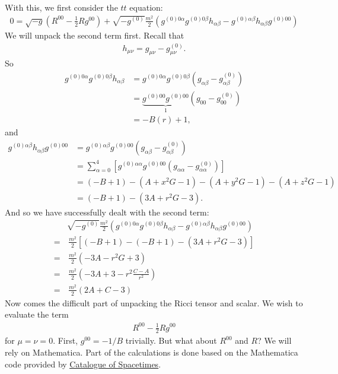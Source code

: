\documentclass{book}
\theoremstyle{definition}
\newcommand{\nn}{\nonumber}
\newcommand{\al}{\alpha}
\newcommand{\be}{\beta}
\newcommand{\f}[2]{\frac{#1}{#2}}
\newcommand{\lp}{\left(}
\newcommand{\rp}{\right)}
\newcommand{\lb}{\left[}
\newcommand{\rb}{\right]}
\begin{document}
With this, we first consider the $tt$ equation:
\begin{align}
{0 = \sqrt{-g}\lp R^{00} - \f{1}{2}Rg^{00} \rp + \sqrt{-g^{(0)}}\f{m^2}{2}\lp g^{(0)0\alpha}g^{(0)0\beta}h_{\alpha\beta} - g^{(0)\alpha\beta}h_{\alpha\beta}g^{(0)00}\rp}
\end{align}
We will unpack the second term first. Recall that
\begin{align}
h_{\mu\nu} = g_{\mu\nu} - g_{\mu\nu}^{(0)}.
\end{align}
So
\begin{align}
g^{(0)0\alpha}g^{(0)0\beta}h_{\alpha\beta} &= g^{(0)0\alpha}g^{(0)0\beta}\lp g_{\al\be} - g_{\al\be}^{(0)} \rp\nn\\
&= \underbrace{g^{(0)00}g^{(0)00}}_{1}\lp g_{00} - g_{00}^{(0)} \rp\nn\\
&= -B(r) + 1,
\end{align}
and
\begin{align}
g^{(0)\alpha\beta}h_{\alpha\beta}g^{(0)00} &= g^{(0)\alpha\beta}g^{(0)00}\lp g_{\al\be} - g_{\al\be}^{(0)}  \rp\nn\\
&= \sum^4_{\alpha=0}\lb g^{(0)\alpha\al}g^{(0)00}\lp g_{\al\al} - g_{\al\al}^{(0)}  \rp  \rb\nn\\
&= \lp-B+1\rp  - \lp A + x^2G -1  \rp -  \lp A + y^2G - 1 \rp - \lp A + z^2G - 1 \rp\nn\\
&= (-B+1) - (3A + r^2G -3).
\end{align}
And so we have successfully dealt with the second term:
\begin{align}
&\sqrt{-g^{(0)}}\f{m^2}{2}\lp g^{(0)0\alpha}g^{(0)0\beta}h_{\alpha\beta} - g^{(0)\alpha\beta}h_{\alpha\beta}g^{(0)00}\rp\nn\\
= &\,\f{m^2}{2}\lb (-B + 1) - (-B+1) - (3A + r^2G-3) \rb\nn\\
= &\,\f{m^2}{2}(-3A - r^2G + 3) \nn\\
= &\,\f{m^2}{2}\lp -3A + 3 - r^2 \f{C-A}{r^2}\rp\nn\\
= &\,\boxed{\f{m^2}{2}\lp  2A + C - 3\rp}
\end{align}
Now comes the difficult part of unpacking the Ricci tensor and scalar. We wish to evaluate the term
\begin{align}
R^{00} - \f{1}{2}Rg^{00}
\end{align}
for $\mu = \nu = 0$. First, $g^{00} = -1/B$ trivially. But what about $R^{00}$ and $R$? We will rely on Mathematica. Part of the calculations is done based on the Mathematica code provided by \href{https://arxiv.org/pdf/0904.4184.pdf}{\underline{Catalogue of Spacetimes}}. \\
\end{document}
